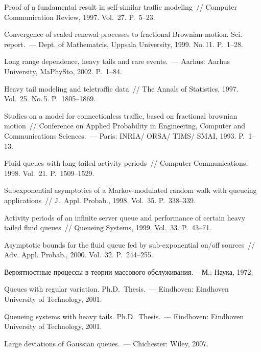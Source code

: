 \begin{multicols}{2}
{{\begin{thebibliography}{99}
Proof of a fundamental result in self-similar traffic modeling~// Computer
Communication Review, 1997. Vol.~27. P.~5--23.

Convergence of scaled renewal processes to fractional
Brownian motion. Sci. report.~--- Dept. of Mathematcis, Uppsala
University, 1999. No.\,11. P.~1--28.

Long range dependence, heavy tails and rare events.~--- Aarhus: Aarhus University, MaPhySto, 2002. P.~1--84.

Heavy tail modeling and teletraffic data~// The Annals of Statistics, 1997. Vol.~25. No.\,5. P.~1805--1869.

Studies on a model for connectionless traffic, based on fractional
 brownian motion~// Conference on Applied Probability in Engineering,
 Computer and Communications Sciences.~---
 Paris: INRIA/ ORSA/ TIMS/ SMAI, 1993. P.~1--13.

Fluid queues with long-tailed activity periods~//
 Computer Communications, 1998. Vol.~21. P.~1509--1529.

Subexponential asymptotics of a Markov-modulated random walk with queueing
 applications~// J.~Appl.
Probab., 1998. Vol.~35. P.~338--339.

Activity periods of an infinite server queue and performance of certain
 heavy tailed fluid
queues~// Queueing Systems, 1999. Vol.~33. P.~43--71.

Asymptotic bounds for the fluid queue fed by sub-exponential on/off
 sources~// Adv. Appl. Probab., 2000. Vol.~32. P.~244--255.

Вероятностные процессы в теории массового обслуживания. -- М.: Наука, 1972.

 Queues with regular variation. Ph.D.\ Thesis.~--- Eindhoven:
Eindhoven University of Technology, 2001.

Queueing systems with heavy tails. Ph.D.\ Thesis.~--- Eindhoven: Eindhoven University of Technology, 2001.

 Large deviations of Gaussian queues.~--- Chichester: Wiley, 2007.


\end{thebibliography}}}
\end{multicols}
